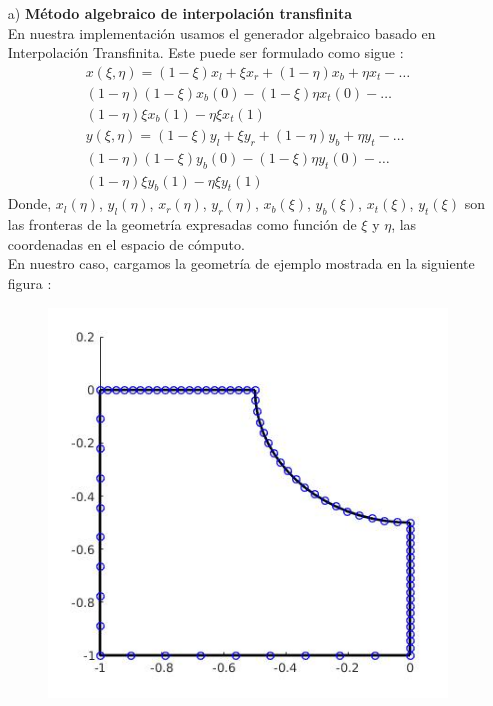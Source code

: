 \documentclass{article}
\begin{document}
\begin{enumerate}
\begin{itemize}
\begin{itemize}
		\item[a)] \textbf{ M\'etodo algebraico de interpolaci\'on transfinita }
		\\
		En nuestra implementaci\'on usamos el generador algebraico basado en Interpolaci\'on Transfinita. Este puede ser formulado como sigue :
		\begin{gather*}
			x( \xi, \eta ) = ( 1 - \xi ) x_{l} + \xi x_{r} + ( 1 - \eta ) x_{b} + \eta x_{t} - \hdots \\
							 ( 1 - \eta ) ( 1 - \xi ) x_{b}(0) - ( 1 - \xi ) \eta x_{t}(0) - \hdots \\
							 ( 1 - \eta ) \xi x_{b}(1) - \eta \xi x_{t}(1)
			\\
			y( \xi, \eta ) = ( 1 - \xi ) y_{l} + \xi y_{r} + ( 1 - \eta ) y_{b} + \eta y_{t} - \hdots \\
							 ( 1 - \eta ) ( 1 - \xi ) y_{b}(0) - ( 1 - \xi ) \eta y_{t}(0) - \hdots \\
							 ( 1 - \eta ) \xi y_{b}(1) - \eta \xi y_{t}(1)
		\end{gather*}
		Donde, $x_l(\eta)$, $y_l(\eta)$, $x_r(\eta)$, $y_r(\eta)$, $x_b(\xi)$, $y_b(\xi)$, $x_t(\xi)$, $y_t(\xi)$ son las
		fronteras de la geometr\'ia expresadas como funci\'on de $ \xi $ y $ \eta $, las coordenadas en el espacio de 
		c\'omputo.
		\\
		En nuestro caso, cargamos la geometr\'ia de ejemplo mostrada en la siguiente figura :
		\begin{figure}[H]
			\centering
			\includegraphics[scale=0.5]{./imgs/img_geometry.jpg}

\end{figure}
\end{itemize}
\end{itemize}
\end{enumerate}
\end{document}
